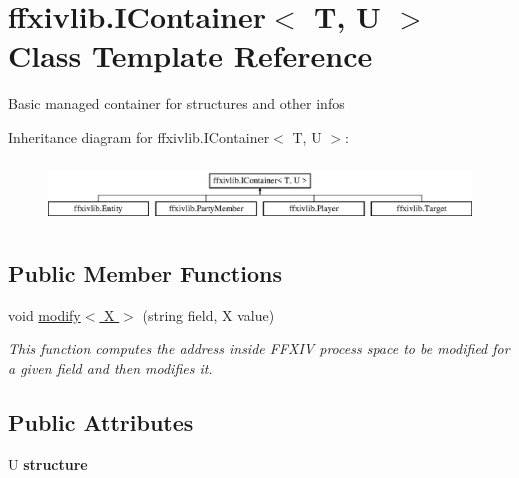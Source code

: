 \hypertarget{classffxivlib_1_1_i_container_3_01_t_00_01_u_01_4}{\section{ffxivlib.\-I\-Container$<$ T, U $>$ Class Template Reference}
\label{classffxivlib_1_1_i_container_3_01_t_00_01_u_01_4}
}


Basic managed container for structures and other infos  


Inheritance diagram for ffxivlib.\-I\-Container$<$ T, U $>$\-:\begin{figure}[H]
\begin{center}
\leavevmode
\includegraphics[height=1.676647cm]{classffxivlib_1_1_i_container_3_01_t_00_01_u_01_4}
\end{center}
\end{figure}
\subsection*{Public Member Functions}
\begin{DoxyCompactItemize}
\item 
void \hyperlink{classffxivlib_1_1_i_container_3_01_t_00_01_u_01_4_ae9081b3163d43d4d655dc72ea50b7a3d}{modify$<$ X $>$} (string field, X value)
\begin{DoxyCompactList}\small\item\em This function computes the address inside F\-F\-X\-I\-V process space to be modified for a given field and then modifies it. \end{DoxyCompactList}\end{DoxyCompactItemize}
\subsection*{Public Attributes}
\begin{DoxyCompactItemize}
\item 
\hypertarget{classffxivlib_1_1_i_container_3_01_t_00_01_u_01_4_a4a077a13df5c84a292c1c03e05bc9ac7}{U {\bfseries structure}}\label{classffxivlib_1_1_i_container_3_01_t_00_01_u_01_4_a4a077a13df5c84a292c1c03e05bc9ac7}

\end{DoxyCompactItemize}
